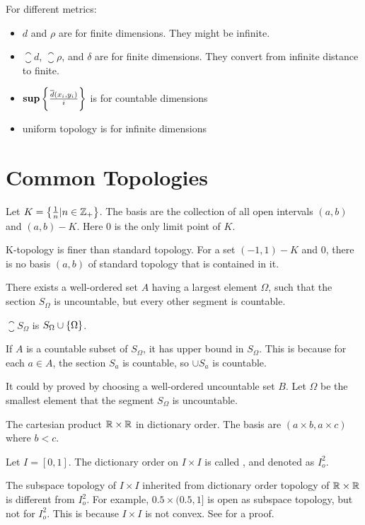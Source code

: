 For different metrics:
\begin{itemize}
    \item $d$ and $\rho$ are for finite dimensions. They might be infinite.
    \item $\closure{d}$, $\closure{\rho}$, and $\delta$ are for finite dimensions. They convert from infinite distance to finite.
    \item $\mathbf{sup} \set{\frac{\overline{d}(x_i, y_i)}{i}}$ is for countable dimensions
    \item uniform topology is for infinite dimensions
\end{itemize}





\section{Common Topologies}

\begin{definition}
    Let $K = \set{\frac{1}{n} | n \in \mathbb{Z}_{+}}$. The basis are the collection of all open intervals $(a,b)$ and $(a,b) - K$. Here $0$ is the only limit point of $K$.
    
    K-topology is finer than standard topology. For a set $(-1,1) - K$ and $0$, there is no basis $(a,b)$ of standard topology that is contained in it.
\end{definition}



\begin{definition}
    There exists a well-ordered set $A$ having a largest element $\Omega$, such that the section $S_\Omega$ is uncountable, but every other segment is countable.
    
    $\closure{S_\Omega}$ is $S_\Omega \cup \set{\Omega}$.
    
    If $A$ is a countable subset of $S_\Omega$, it has upper bound in $S_\Omega$. This is because for each $a \in A$, the section $S_a$ is countable, so $\cup S_a$ is countable.
    
    It could by proved by choosing a well-ordered uncountable set $B$. Let $\Omega$ be the smallest element that the segment $S_\Omega$ is uncountable.
\end{definition}

\begin{definition}[\cindex{$I_o^2$}]
    The cartesian product $\mathbb{R} \times \mathbb{R}$ in dictionary order. The basis are $(a\times b, a\times c)$ where $b < c$.
    
    Let $I=[0,1]$. The dictionary order on $I \times I$ is called , and denoted as $I_o^2$. 
    
    The subspace topology of $I \times I$ inherited from dictionary order topology of $\mathbb{R} \times \mathbb{R}$ is different from $I_o^2$. For example, $0.5 \times (0.5,1]$ is open as subspace topology, but not for $I_o^2$. This is because $I \times I$ is not convex. See  for a proof.
\end{definition}

